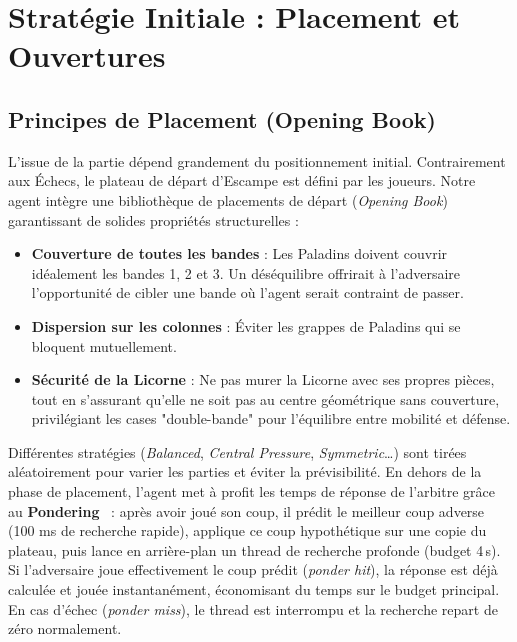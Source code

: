 \documentclass[12pt,a4paper]{article}
\begin{document}
\section{Stratégie Initiale : Placement et Ouvertures}
\subsection{Principes de Placement (Opening Book)}
L'issue de la partie dépend grandement du positionnement initial. Contrairement aux Échecs, le plateau de départ d'Escampe est défini par les joueurs. Notre agent intègre une bibliothèque de placements de départ (\textit{Opening Book}) garantissant de solides propriétés structurelles :
\begin{itemize}
    \item \textbf{Couverture de toutes les bandes} : Les Paladins doivent couvrir idéalement les bandes 1, 2 et 3. Un déséquilibre offrirait à l'adversaire l'opportunité de cibler une bande où l'agent serait contraint de passer.
    \item \textbf{Dispersion sur les colonnes} : Éviter les grappes de Paladins qui se bloquent mutuellement.
    \item \textbf{Sécurité de la Licorne} : Ne pas murer la Licorne avec ses propres pièces, tout en s'assurant qu'elle ne soit pas au centre géométrique sans couverture, privilégiant les cases "double-bande" pour l'équilibre entre mobilité et défense.
\end{itemize}
Différentes stratégies (\textit{Balanced}, \textit{Central Pressure}, \textit{Symmetric}…) sont tirées aléatoirement pour varier les parties et éviter la prévisibilité. En dehors de la phase de placement, l'agent met à profit les temps de réponse de l'arbitre grâce au \textbf{Pondering}~\cite{cp_pondering} : après avoir joué son coup, il prédit le meilleur coup adverse (100 ms de recherche rapide), applique ce coup hypothétique sur une copie du plateau, puis lance en arrière-plan un thread de recherche profonde (budget 4\,s). Si l'adversaire joue effectivement le coup prédit (\textit{ponder hit}), la réponse est déjà calculée et jouée instantanément, économisant du temps sur le budget principal. En cas d'échec (\textit{ponder miss}), le thread est interrompu et la recherche repart de zéro normalement.
\end{document}
